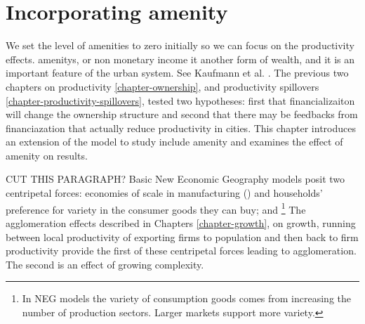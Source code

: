 \chapter[Amenity]{Incorporating amenity}\label{chapter-amenity}



We set the level of amenities to zero initially so we can focus on the productivity effects.  \glspl{amenity}, or non monetary income it another form of wealth, and it is %
an important feature of the urban system. See Kaufmann et al. \cite{kaufmannScalingUrbanAmenities2022}. 
The previous two chapters on productivity \ref{chapter-ownership}, and productivity spillovers \ref{chapter-productivity-spillovers}, tested two hypotheses: first that financializaiton will change the ownership structure and second that there may be feedbacks from financiazation that actually reduce productivity in cities. This chapter introduces an extension of the model to study include \gls{amenity} and examines the effect of amenity on results.

CUT THIS PARAGRAPH? Basic New Economic Geography models posit two centripetal forces: economies of scale in manufacturing (\cite{gurwitzCatastrophicAgglomeration2019}) and households' preference for variety in the consumer goods they can buy; and \footnote{In NEG models the variety of consumption goods comes from increasing the number of  production sectors. Larger markets support more variety.} The agglomeration effects described in Chapters \ref{chapter-growth}, on growth,  running between local productivity  of exporting firms to population and then back to firm productivity provide the first of these centripetal forces leading to agglomeration. The second is an effect of growing complexity. 

